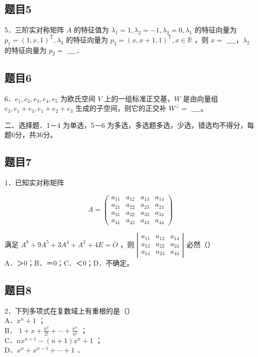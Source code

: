 \documentclass{article}
\begin{document}
\subsection{题目5}
5．三阶实对称矩阵 \(A\) 的特征值为 \(\lambda_{1}=1, \lambda_{2}=-1, \lambda_{3}=0, \lambda_{1}\) 的特征向量为 \(p_{1}=(1, x, 1)^{\mathrm{T}}, \lambda_{3}\) 的特征向量为 \(p_{3}=(x, x+1,1)^{\mathrm{T}}, x \in \mathbb{R}\) ，则 \(x=\) \(\_\_\_\_\)，\(\lambda_{2}\) 的特征向量为 \(p_{2}=\) \(\_\_\_\_\)．

\subsection{题目6}
6．\(e_{1}, e_{2}, e_{3}, e_{4}, e_{5}\) 为欧氏空间 \(V\) 上的一组标准正交基，\(W\) 是由向量组 \(e_{3}, e_{1}+e_{3}, e_{1}+e_{2}+e_{3}\) 生成的子空间，则它的正交补 \(W^{\perp}=\) \(\_\_\_\_\)。

二、选择题．1－4 为单选，5－6 为多选，多选题多选，少选，错选均不得分，每题6分，共36分。\\

\subsection{题目7}
1．已知实对称矩阵

\[
A=\left(\begin{array}{cccc}
a_{11} & a_{12} & a_{13} & a_{14} \\
a_{21} & a_{22} & a_{23} & a_{24} \\
a_{31} & a_{32} & a_{33} & a_{34} \\
a_{41} & a_{42} & a_{43} & a_{44}
\end{array}\right)
\]

满足 \(A^{8}+9 A^{5}+3 A^{4}+A^{2}+4 E=O\) ，则 \(\left|\begin{array}{ccc}a_{11} & a_{12} & a_{14} \\ a_{12} & a_{22} & a_{24} \\ a_{14} & a_{24} & a_{44}\end{array}\right|\) 必然（）\\
A．＞0；B．＝0；C．＜0；D．不确定。

\subsection{题目8}
2．下列多项式在复数域上有重根的是（）\\
A．\(x^{n}+1\) ；\\
B． \(1+x+\frac{x^{2}}{2!}+\cdots+\frac{x^{n}}{n!}\) ；\\
C．\(n x^{n+1}-(n+1) x^{n}+1\) ；\\
D．\(x^{n}+x^{n-1}+\cdots+1\) ．
\end{document}
